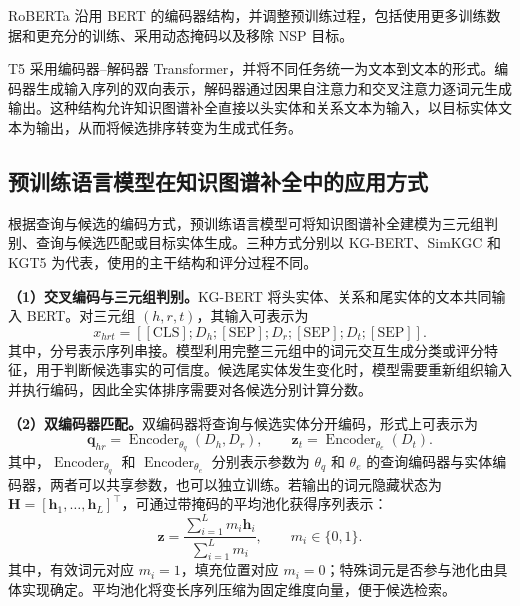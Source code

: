 RoBERTa 沿用 BERT 的编码器结构，并调整预训练过程，包括使用更多训练数据和更充分的训练、采用动态掩码以及移除 NSP 目标\cite{liu2019roberta}。

T5 采用编码器--解码器 Transformer，并将不同任务统一为文本到文本的形式\cite{raffel2020t5}。编码器生成输入序列的双向表示，解码器通过因果自注意力和交叉注意力逐词元生成输出。这种结构允许知识图谱补全直接以头实体和关系文本为输入，以目标实体文本为输出，从而将候选排序转变为生成式任务。

\subsection{预训练语言模型在知识图谱补全中的应用方式}

根据查询与候选的编码方式，预训练语言模型可将知识图谱补全建模为三元组判别、查询与候选匹配或目标实体生成。三种方式分别以 KG-BERT、SimKGC 和 KGT5 为代表，使用的主干结构和评分过程不同。

\textbf{（1）交叉编码与三元组判别。}KG-BERT 将头实体、关系和尾实体的文本共同输入 BERT。对三元组 $(h,r,t)$，其输入可表示为\cite{yao2019kgbert}
\begin{equation}
    x_{hrt}=[\mathrm{[CLS]};D_h;\mathrm{[SEP]};D_r;
      \mathrm{[SEP]};D_t;\mathrm{[SEP]}].
\end{equation}
其中，分号表示序列串接。模型利用完整三元组中的词元交互生成分类或评分特征，用于判断候选事实的可信度。候选尾实体发生变化时，模型需要重新组织输入并执行编码，因此全实体排序需要对各候选分别计算分数。

\textbf{（2）双编码器匹配。}双编码器将查询与候选实体分开编码，形式上可表示为
\begin{equation}
    \mathbf{q}_{hr}=\operatorname{Encoder}_{\theta_q}(D_h,D_r),\qquad
    \mathbf{z}_t=\operatorname{Encoder}_{\theta_e}(D_t).
    \label{eq:bg_biencoder}
\end{equation}
其中，$\operatorname{Encoder}_{\theta_q}$ 和 $\operatorname{Encoder}_{\theta_e}$ 分别表示参数为 $\theta_q$ 和 $\theta_e$ 的查询编码器与实体编码器，两者可以共享参数，也可以独立训练。若输出的词元隐藏状态为 $\mathbf{H}=[\mathbf{h}_1,\ldots,\mathbf{h}_L]^{\top}$，可通过带掩码的平均池化获得序列表示：
\begin{equation}
    \mathbf{z}=\frac{\sum_{i=1}^{L}m_i\mathbf{h}_i}
                       {\sum_{i=1}^{L}m_i},
    \qquad m_i\in\{0,1\}.
    \label{eq:bg_pooling}
\end{equation}
其中，有效词元对应 $m_i=1$，填充位置对应 $m_i=0$；特殊词元是否参与池化由具体实现确定。平均池化将变长序列压缩为固定维度向量，便于候选检索。


